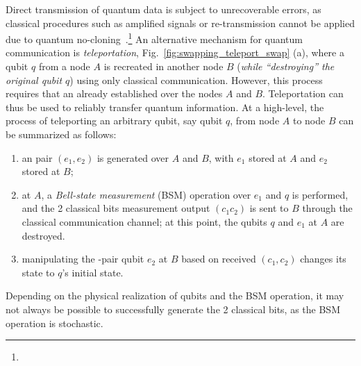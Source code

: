 Direct transmission of quantum data 
is subject to unrecoverable errors, 
as classical procedures such as amplified signals 
or re-transmission cannot be applied due to quantum no-cloning~\cite{wooterszurek-nocloning,Dieks-nocloning}.\footnote{}
An alternative mechanism
for quantum communication is \emph{teleportation}, Fig.~\ref{fig:swapping_teleport_swap} (a), where a qubit $q$ from a node $A$
is recreated in another node $B$ (\emph{while ``destroying'' the original
qubit $q$}) using only classical communication.
However, this process requires that an \eps 
already established over the nodes $A$ and $B$. 
Teleportation can thus be used to reliably transfer quantum information.
At a high-level, 
the process of teleporting an arbitrary qubit,
say qubit $q$, from node $A$ to node $B$ can
be summarized as follows:
\begin{enumerate}
\item an \eps pair $(e_1, e_2)$ is generated over
$A$ and $B$, with  $e_1$ stored at $A$ and
$e_2$ stored at $B$;

\item 
at $A$, a \textit{Bell-state measurement} (BSM) operation 
over $e_1$ and $q$ is performed,
and the 2 classical bits measurement output $(c_1 c_2)$ is sent to $B$
through the classical communication channel; 
at this point, the qubits $q$ and $e_1$ at $A$ are destroyed.

\item manipulating the \eps-pair qubit $e_2$ 
at $B$ based on received $(c_1, c_2)$ 
changes its state to $q$'s initial state.
\end{enumerate}
Depending on the physical realization of qubits and the BSM operation, 
it may not always be possible to successfully generate the 2 classical bits,
as the BSM operation is stochastic.

